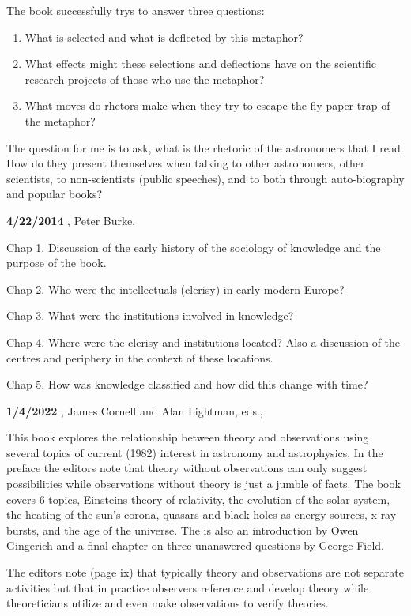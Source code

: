 The book successfully trys to answer three questions:
\begin{enumerate}
  \item What is selected and what is deflected by this metaphor?
  \item What effects might these selections and deflections have on the
scientific research projects of those who use the metaphor?
  \item What moves do rhetors make when they try to escape the fly
paper trap of the metaphor?
\end{enumerate}

The question for me is to ask, what is the rhetoric of the astronomers
that I read.  How do they present themselves when talking to other
astronomers, other scientists, to non-scientists (public speeches),
and to both through auto-biography and popular books?


{\bf 4/22/2014}
,
Peter Burke, \cite{Burke2000}

Chap 1. Discussion of the early history of the sociology of knowledge
and the purpose of the book.

Chap 2. Who were the intellectuals (clerisy) in early modern Europe?

Chap 3. What were the institutions involved in knowledge?

Chap 4. Where were the clerisy and institutions located? Also a discussion
of the centres and periphery in the context of these locations.

Chap 5. How was knowledge classified and how did this change with time?

{\bf 1/4/2022}
,
James Cornell and Alan Lightman, eds., \cite{Cornell1982}

This book explores the relationship between theory and observations
using several topics of current (1982) interest in astronomy and
astrophysics. In the preface the editors note that theory without
observations can only suggest possibilities while observations without
theory is just a jumble of facts.  The book covers 6 topics, Einsteins
theory of relativity, the evolution of the solar system, the heating of
the sun's corona, quasars and black holes as energy sources, x-ray bursts,
and the age of the universe. The is also an introduction by Owen Gingerich
and a final chapter on three unanswered questions by George Field.

The editors note (page ix) that typically theory and observations are
not separate activities but that in practice observers reference and
develop theory while theoreticians utilize and even make observations
to verify theories.

